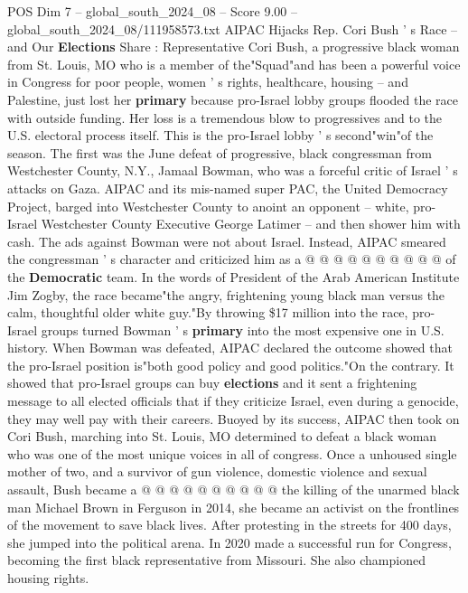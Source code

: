 \begin{textsample}{POS Dim 7 – global\_south\_2024\_08 – Score 9.00 – global\_south\_2024\_08/111958573.txt}  \label{ex:f7_pos_185}
AIPAC Hijacks Rep.
Cori Bush ' s Race -- and Our \textbf{Elections} Share : Representative Cori Bush, a progressive black woman from St.
Louis, MO who is a member of the"Squad"and has been a powerful voice in Congress for poor people, women ' s rights, healthcare, housing -- and Palestine, just lost her \textbf{primary} because pro-Israel lobby groups flooded the race with outside funding.
Her loss is a tremendous blow to progressives and to the U.S. electoral process itself.
This is the pro-Israel lobby ' s second"win"of the season.
The first was the June defeat of progressive, black congressman from Westchester County, N.Y., Jamaal Bowman, who was a forceful critic of Israel ' s attacks on Gaza.
AIPAC and its mis-named super PAC, the United Democracy Project, barged into Westchester County to anoint an opponent -- white, pro-Israel Westchester County Executive George Latimer -- and then shower him with cash.
The ads against Bowman were not about Israel.
Instead, AIPAC smeared the congressman ' s character and criticized him as a @ @ @ @ @ @ @ @ @ @ of the \textbf{Democratic} team.
In the words of President of the Arab American Institute Jim Zogby, the race became"the angry, frightening young black man versus the calm, thoughtful older white guy."By throwing \$17 million into the race, pro-Israel groups turned Bowman ' s \textbf{primary} into the most expensive one in U.S. history.
When Bowman was defeated, AIPAC declared the outcome showed that the pro-Israel position is"both good policy and good politics."On the contrary.
It showed that pro-Israel groups can buy \textbf{elections} and it sent a frightening message to all elected officials that if they criticize Israel, even during a genocide, they may well pay with their careers.
Buoyed by its success, AIPAC then took on Cori Bush, marching into St.
Louis, MO determined to defeat a black woman who was one of the most unique voices in all of congress.
Once a unhoused single mother of two, and a survivor of gun violence, domestic violence and sexual assault, Bush became a @ @ @ @ @ @ @ @ @ @ the killing of the unarmed black man Michael Brown in Ferguson in 2014, she became an activist on the frontlines of the movement to save black lives.
After protesting in the streets for 400 days, she jumped into the political arena.
In 2020 made a successful run for Congress, becoming the first black representative from Missouri.
She also championed housing rights.

\end{textsample}
